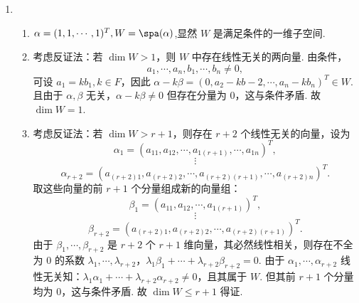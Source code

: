 \begin{enumerate}
    \item \begin{enumerate}
        \item $\alpha=(1,1,\cdots,1)^T, W=\spa(\alpha)$,显然 $W$ 是满足条件的一维子空间.
        \item 考虑反证法：若 $\dim W>1$，则 $W$ 中存在线性无关的两向量. 由条件，
        \[a_1,\cdots,a_n,b_1,\cdots,b_n\ne 0,\]
        可设 $a_1=kb_1,k\in F$，因此 $\alpha-k\beta=(0,a_2-kb-2,\cdots,a_n-kb_n)^T\in W$. 且由于 $\alpha,\beta$ 无关，$\alpha-k\beta\ne 0$ 但存在分量为 $0$，这与条件矛盾. 故 $\dim W=1$.
        \item 考虑反证法：若 $\dim W>r+1$，则存在 $r+2$ 个线性无关的向量，设为
        \[\alpha_1=(a_{11},a_{12},\cdots,a_{1(r+1)},\cdots,a_{1n})^T,\]
        \[\vdots\]
        \[\alpha_{r+2}=(a_{(r+2)1},a_{(r+2)2},\cdots,a_{(r+2)(r+1)},\cdots,a_{(r+2)n})^T.\]
        取这些向量的前 $r+1$ 个分量组成新的向量组：
        \[\beta_1=(a_{11},a_{12},\cdots,a_{1(r+1)})^T,\]
        \[\vdots\]
        \[\beta_{r+2}=(a_{(r+2)1},a_{(r+2)2},\cdots,a_{(r+2)(r+1)})^T.\]
        由于 $\beta_1,\cdots,\beta_{r+2}$ 是 $r+2$ 个 $r+1$ 维向量，其必然线性相关，则存在不全为 $0$ 的系数 $\lambda_1,\cdots,\lambda_{r+2}$，$\lambda_1\beta_1+\cdots+\lambda_{r+2}\beta_{r+2}=0.$ 由于 $\alpha_1,\cdots,\alpha_{r+2}$ 线性无关知：$\lambda_1\alpha_1+\cdots+\lambda_{r+2}\alpha_{r+2}\ne 0$，且其属于 $W$. 但其前 $r+1$ 个分量均为 $0$，这与条件矛盾. 故 $\dim W\le r+1$ 得证.
    \end{enumerate}
\end{enumerate}

\clearpage
